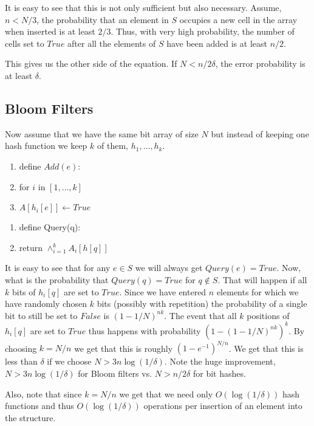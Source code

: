 \documentclass{article}
\begin{document}
It is easy to see that this is not only sufficient but also necessary. 
Assume, $n < N/3$, the probability that an element in $S$ occupies a new cell in the 
array when inserted is at least $2/3$. Thus, with very high probability, the number of 
cells set to $True$ after all the elements of $S$ have been added is at least $n/2$.

This gives us the other side of the equation. If $N < n/2\delta$, the error probability is at least $\delta$.


\subsection*{Bloom Filters}

Now assume that we have the same bit array of size $N$ but instead of keeping one hash 
function we keep $k$ of them, $h_1,\ldots,h_k$.
\begin{enumerate}
\item define  $Add(e)$:
\item \tab for $i$ in $[1,\ldots,k]$
\item \tab \tab $A[h_i[e]] \leftarrow True$ 
\end{enumerate}

\begin{enumerate}
\item define  Query(q):
\item \tab return $\wedge_{i=1}^{k}A_i[h[q]]$ 
\end{enumerate}


It is easy to see that for any $e \in S$ we will always get $Query(e) = True$.
Now, what is the probability that $Query(q) = True$ for $q \not \in S$.
That will happen if all $k$ bits of $h_i[q]$ are set to $True$.
Since we have entered $n$ elements for which we have randomly chosen $k$
bits (possibly with repetition) the probability of a single bit to still be set to $False$ is 
$(1-1/N)^{nk}$. The event that all $k$ positions of $h_i[q]$ are set to $True$ thus happens with 
probability $(1 - (1-1/N)^{nk} )^{k}$. By choosing $k = N/n$ we get that this is roughly $(1-e^{-1})^{N/n}$.
We get that this is less than $\delta$ if we choose $N > 3n  \log(1/\delta)$.
Note the huge improvement, $N > 3n  \log(1/\delta)$ for Bloom filters vs. $N > n/2\delta$ for bit hashes.

Also, note that since $k = N/n$ we get that we need only  $O(\log(1/\delta))$ 
hash functions and thus $O(\log(1/\delta))$ operations per insertion of an element into the structure.
\end{document}
